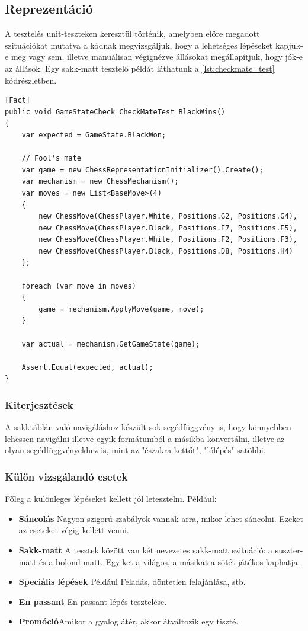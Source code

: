 \documentclass[twoside, a4paper, 12pt]{article}
\begin{document}
\subsection{Reprezentáció}
A tesztelés unit-teszteken keresztül történik, amelyben előre megadott szituációkat mutatva a kódnak megvizsgáljuk, hogy a lehetséges lépéseket kapjuk-e meg vagy sem, illetve manuálisan végignézve állásokat megállapítjuk, hogy jók-e az állások. Egy sakk-matt tesztelő példát láthatunk a \ref{lst:checkmate_test} kódrészletben.

\begin{lstlisting}[caption=Sakk-matt detektálás teszt, label=lst:checkmate_test, float]
[Fact]
public void GameStateCheck_CheckMateTest_BlackWins()
{
	var expected = GameState.BlackWon;
	
	// Fool's mate
	var game = new ChessRepresentationInitializer().Create();
	var mechanism = new ChessMechanism();
	var moves = new List<BaseMove>(4)
	{
		new ChessMove(ChessPlayer.White, Positions.G2, Positions.G4),
		new ChessMove(ChessPlayer.Black, Positions.E7, Positions.E5),
		new ChessMove(ChessPlayer.White, Positions.F2, Positions.F3),
		new ChessMove(ChessPlayer.Black, Positions.D8, Positions.H4)
	};
	
	foreach (var move in moves)
	{
		game = mechanism.ApplyMove(game, move);
	}
	
	var actual = mechanism.GetGameState(game);
	
	Assert.Equal(expected, actual);
}
\end{lstlisting}
\subsubsection{Kiterjesztések}
A sakktáblán való navigáláshoz készült sok segédfüggvény is, hogy könnyebben lehessen navigálni illetve egyik formátumból a másikba konvertálni, illetve az olyan segédfüggvényekhez is, mint az "északra kettőt", "lólépés" satöbbi.

\subsubsection{Külön vizsgálandó esetek}
Főleg a különleges lépéseket kellett jól letesztelni. Például:
\begin{itemize}
	\item \textbf{Sáncolás} Nagyon szigorú szabályok vannak arra, mikor lehet sáncolni. Ezeket az eseteket végig kellett venni.
	
	\item \textbf{Sakk-matt} A tesztek között van két nevezetes sakk-matt szituáció: a suszter-matt és a bolond-matt. Egyiket a világos, a másikat a sötét játékos kaphatja.
	
	\item \textbf{Speciális lépések} Például Feladás, döntetlen felajánlása, stb.
	
	\item \textbf{En passant} En passant lépés tesztelése.
	
	\item \textbf{Promóció}Amikor a gyalog átér, akkor átváltozik egy tiszté.
\end{itemize}
\end{document}
